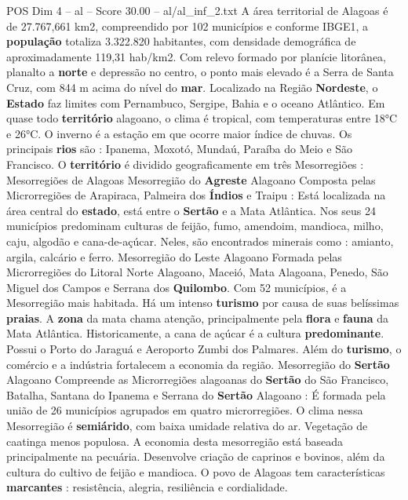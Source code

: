 \begin{textsample}{POS Dim 4 – al – Score 30.00 – al/al\_inf\_2.txt}  \label{ex:f4_pos_042}
A área territorial de Alagoas é de 27.767,661 km2, compreendido por 102 municípios e conforme IBGE1, a \textbf{população} totaliza 3.322.820 habitantes, com densidade demográfica de aproximadamente 119,31 hab/km2.
Com relevo formado por planície litorânea, planalto a \textbf{norte} e depressão no centro, o ponto mais elevado é a Serra de Santa Cruz, com 844 m acima do nível do \textbf{mar}.
Localizado na Região \textbf{Nordeste}, o \textbf{Estado} faz limites com Pernambuco, Sergipe, Bahia e o oceano Atlântico.
Em quase todo \textbf{território} alagoano, o clima é tropical, com temperaturas entre 18{\EmojiFont °}C e 26{\EmojiFont °}C.
O inverno é a estação em que ocorre maior índice de chuvas.
Os principais \textbf{rios} são : Ipanema, Moxotó, Mundaú, Paraíba do Meio e São Francisco.
O \textbf{território} é dividido geograficamente em três Mesorregiões : Mesorregiões de Alagoas Mesorregião do \textbf{Agreste} Alagoano Composta pelas Microrregiões de Arapiraca, Palmeira dos \textbf{Índios} e Traipu : Está localizada na área central do \textbf{estado}, está entre o \textbf{Sertão} e a Mata Atlântica.
Nos seus 24 municípios predominam culturas de feijão, fumo, amendoim, mandioca, milho, caju, algodão e cana-de-açúcar.
Neles, são encontrados minerais como : amianto, argila, calcário e ferro.
Mesorregião do Leste Alagoano Formada pelas Microrregiões do Litoral Norte Alagoano, Maceió, Mata Alagoana, Penedo, São Miguel dos Campos e Serrana dos \textbf{Quilombo}.
Com 52 municípios, é a Mesorregião mais habitada.
Há um intenso \textbf{turismo} por causa de suas belíssimas \textbf{praias}.
A \textbf{zona} da mata chama atenção, principalmente pela \textbf{flora} e \textbf{fauna} da Mata Atlântica.
Historicamente, a cana de açúcar é a cultura \textbf{predominante}.
Possui o Porto do Jaraguá e Aeroporto Zumbi dos Palmares.
Além do \textbf{turismo}, o comércio e a indústria fortalecem a economia da região.
Mesorregião do \textbf{Sertão} Alagoano Compreende as Microrregiões alagoanas do \textbf{Sertão} do São Francisco, Batalha, Santana do Ipanema e Serrana do \textbf{Sertão} Alagoano : É formada pela união de 26 municípios agrupados em quatro microrregiões.
O clima nessa Mesorregião é \textbf{semiárido}, com baixa umidade relativa do ar.
Vegetação de caatinga menos populosa.
A economia desta mesorregião está baseada principalmente na pecuária.
Desenvolve criação de caprinos e bovinos, além da cultura do cultivo de feijão e mandioca.
O povo de Alagoas tem características \textbf{marcantes} : resistência, alegria, resiliência e cordialidade.

\end{textsample}
